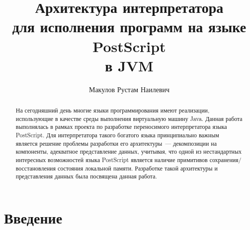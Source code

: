 \title{Архитектура интерпретатора\\ 
для исполнения программ на языке PostScript\\
в JVM}
%
\author{Макулов Рустам Наилевич}
%
%
%

\renewcommand\lstlistingname{Листинг}
\renewcommand{\thelstlisting}{\arabic{lstlisting}}

\lstset{
commentstyle=\scriptsize\rmfamily
}

\maketitle              %

\begin{abstract}
На сегодняшний день многие языки программирования имеют реализации, использующие в качестве среды выполнения 
виртуальную машину Java. Данная работа выполнялась в рамках проекта по разработке переносимого интерпретатора языка PostScript. 
Для интерпретатора такого богатого языка принципиально важным является решение проблемы разработки его архитектуры~--- декомпозиции 
на компоненты, адекватное представление данных, учитывая, что одной из нестандартных интересных возможностей языка PostScript 
является наличие примитивов сохранения/восстановления состояния локальной памяти. Разработке такой архитектуры и представления 
данных была посвящена данная работа.
\end{abstract}

\section*{Введение}

